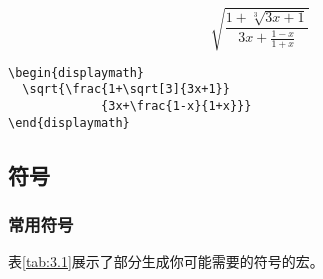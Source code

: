 \begin{codelist}[3.2]{
  \begin{displaymath}
    \sqrt{\frac{1+\sqrt[3]{3x+1}}
              {3x+\frac{1-x}{1+x}}}
  \end{displaymath}
}
\begin{verbatim}
\begin{displaymath}
  \sqrt{\frac{1+\sqrt[3]{3x+1}}
             {3x+\frac{1-x}{1+x}}}
\end{displaymath}\end{verbatim}
\end{codelist}

\subsection{符号}

\subsubsection{常用符号}

表\ref{tab:3.1}展示了部分生成你可能需要的符号的宏。

